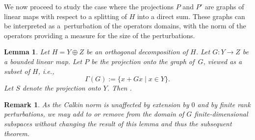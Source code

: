 \documentclass[10pt,a4paper]{amsart}
\numberwithin{equation}{section}
\newtheorem{Lemma}[Theorem]{Lemma}
\newtheorem{Remark}[Theorem]{Remark} }
\begin{document}
	We now proceed to study the case where the projections $P$ and $P'$ are graphs of linear maps with respect to a splitting of $H$ into a direct sum. These graphs can be interpreted as a~perturbation of the operators domains, with the norm of the operators providing a measure for the size of the perturbations.
	\begin{Lemma}
		\label{graphest}
		Let $H=Y\oplus Z$ be an orthogonal decomposition of $H$. Let $G\colon Y\rightarrow Z$ be a bounded linear map. Let $P$ be the projection onto the graph of~$G$, viewed as a subset of $H$, i.e.,
		\[\Gamma(G):=\{x+Gx\mid x\in Y\}.\]
		Let $S$ denote the projection onto $Y$. Then .
	\end{Lemma}
	\begin{Remark}
		As the Calkin norm is unaffected by extension by $0$ and by finite rank perturbations, we may add to or remove from the domain of $G$ finite-dimensional subspaces without changing the result of this lemma and thus the subsequent theorem.
	\end{Remark}	
\end{document}
